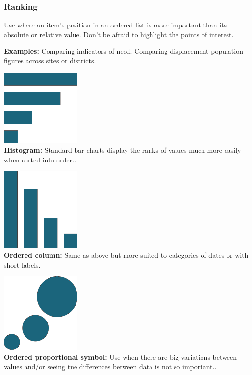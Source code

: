 \documentclass[
  a4paper,
  onecolumn,
  oneside]{book}
\begin{document}
\hypertarget{ranking}{%
\subsubsection{Ranking}\label{ranking}}

Use where an item's position in an ordered list is more important than
its absolute or relative value. Don't be afraid to highlight the points
of interest.

\textbf{Examples:} Comparing indicators of need. Comparing displacement
population figures across sites or districts.

\includegraphics{part1/images/ranking1.png}\\
\textbf{Histogram:} Standard bar charts display the ranks of values much
more easily when sorted into order..

\includegraphics{part1/images/ranking2.png}\\
\textbf{Ordered column:} Same as above but more suited to categories of
dates or with short labels.

\includegraphics{part1/images/ranking3.png}\\
\textbf{Ordered proportional symbol:} Use when there are big variations
between values and/or seeing tne differences between data is not so
important..
\end{document}
